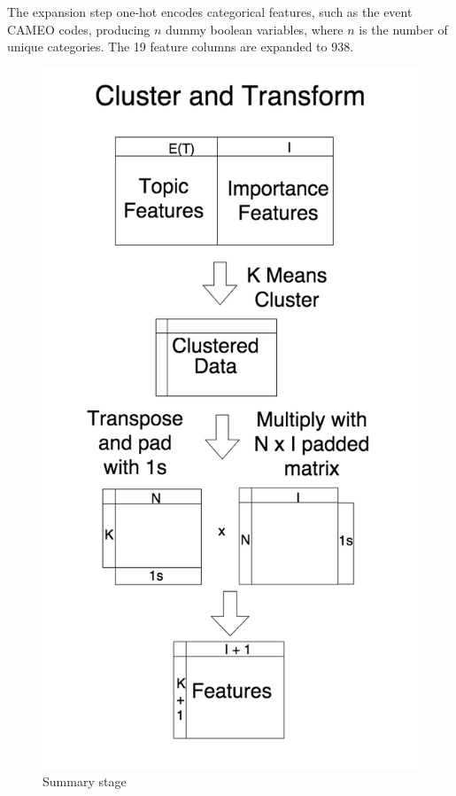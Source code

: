 The expansion step one-hot encodes categorical features, such as the event CAMEO codes,  producing $n$ dummy boolean variables, where $n$ is the number of unique categories. The 19 feature columns are expanded to 938.


\begin{figure}[ht]
\vskip 0.2in
\begin{center}
\centerline{\includegraphics[scale=0.15]{images/cluster_and_transform_vertical.png}}
\caption{Summary stage}
\end{center}
\vskip -0.2in
\label{fig:summarization}
\end{figure}

